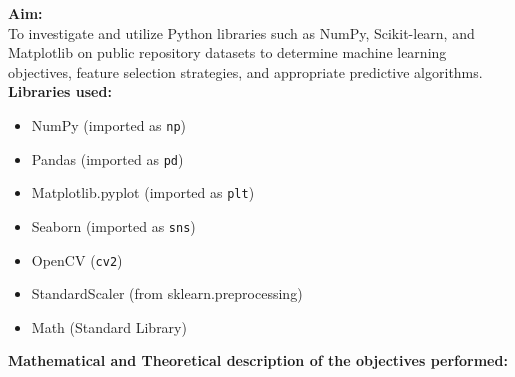 \documentclass[11pt]{article}
\begin{document}
\noindent \textbf{Aim:} \\
To investigate and utilize Python libraries such as NumPy, Scikit-learn, and Matplotlib on public repository datasets to determine machine learning objectives, feature selection strategies, and appropriate predictive algorithms.
\vspace{0.5cm}
\noindent
\textbf{Libraries used:}
\begin{itemize}[noitemsep]
    \item NumPy (imported as \texttt{np})
    \item Pandas (imported as \texttt{pd})
    \item Matplotlib.pyplot (imported as \texttt{plt})
    \item Seaborn (imported as \texttt{sns})
    \item OpenCV (\texttt{cv2})
    \item StandardScaler (from sklearn.preprocessing)
    \item Math (Standard Library)
    
\end{itemize}
\vspace{0.5cm}
\noindent
\textbf{Mathematical and Theoretical description of the objectives performed:}
\end{document}
